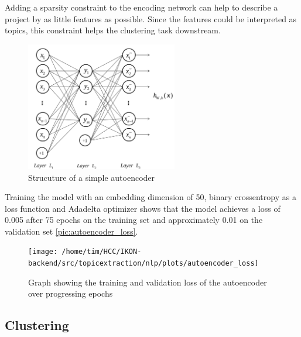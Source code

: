 Adding a sparsity constraint to the encoding network can help to describe a project by as little features as possible. Since the features could be interpreted as topics, this constraint helps the clustering task downstream.

\begin{figure}[t]
	\centering
	\includegraphics[width=250px]{../chapters/implementation/pics/autoencoder}
	\caption{\label{pic:autoencoder} Strucuture of a simple autoencoder {\cite{wangAutoencoderBasedDimensionality2016}}}
\end{figure} 

Training the model with an embedding dimension of 50, binary crossentropy as a loss function and Adadelta optimizer shows that the model achieves a loss of 0.005 after 75 epochs on the training set and approximately 0.01 on the validation set \autoref{pic:autoencoder_loss}.

\begin{figure}[t]
	\centering
	\texttt{[image: /home/tim/HCC/IKON-backend/src/topicextraction/nlp/plots/autoencoder\_loss]}
	\caption{\label{pic:autoencoder_loss} Graph showing the training and validation loss of the autoencoder over progressing epochs}
\end{figure}

 

\subsection{Clustering}

